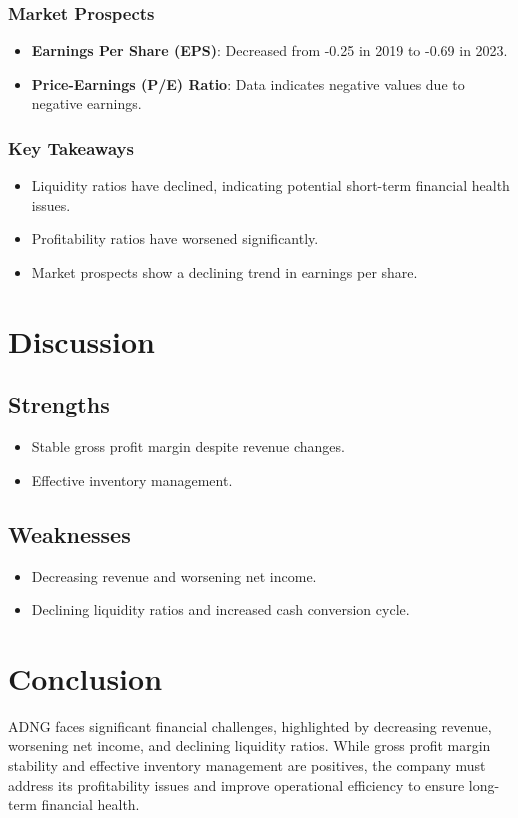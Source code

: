 \documentclass{article}
\begin{document}
\subsubsection{Market Prospects}
\begin{itemize}
    \item \textbf{Earnings Per Share (EPS)}: Decreased from -0.25 in 2019 to -0.69 in 2023.
    \item \textbf{Price-Earnings (P/E) Ratio}: Data indicates negative values due to negative earnings.
\end{itemize}

\subsubsection{Key Takeaways}
\begin{itemize}
    \item Liquidity ratios have declined, indicating potential short-term financial health issues.
    \item Profitability ratios have worsened significantly.
    \item Market prospects show a declining trend in earnings per share.
\end{itemize}

\section{Discussion}
\subsection{Strengths}
\begin{itemize}
    \item Stable gross profit margin despite revenue changes.
    \item Effective inventory management.
\end{itemize}

\subsection{Weaknesses}
\begin{itemize}
    \item Decreasing revenue and worsening net income.
    \item Declining liquidity ratios and increased cash conversion cycle.
\end{itemize}

\section{Conclusion}
ADNG faces significant financial challenges, highlighted by decreasing revenue, worsening net income, and declining liquidity ratios. While gross profit margin stability and effective inventory management are positives, the company must address its profitability issues and improve operational efficiency to ensure long-term financial health.
\end{document}
